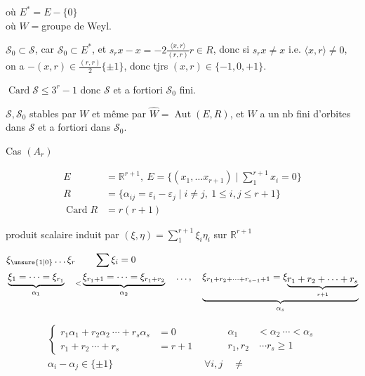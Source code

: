 où $E^*=E-\{0\}$\\ où $W={}$groupe de Weyl.

$\mathscr S_0\subset\mathscr S$, car $\mathscr S_0\subset E^*$, et  $s_rx-x=-2\frac{\langle x,r\rangle}{(r,r)}r\in R$, donc si $s_rx\ne x$ i.e. $\langle x,r\rangle\ne0$, on a $-(x,r)\in\frac{(r,r)}2\{\pm1\}$, donc  tjrs  $(x,r)\in\{-1,0,+1\}$.


$\operatorname{Card}\mathscr S\leq3^r-1$ donc $\mathscr S$ et a fortiori $\mathscr S_0$ fini.

$\mathscr S,\mathscr S_0$ stables par $W$ et même par $\widehat W=\operatorname{Aut}(E,R)$, et $W$ a un nb fini d’orbites dans $\mathscr S$ et a fortiori dans $\mathscr S_0$.

Cas $(A_r)$

\[
\begin{aligned}
E&=\mathbb R^{r+1},\ E=\{(x_1,\ldots x_{r+1})\mid\sum_1^{r+1}x_i=0\}\\
R&=\{\alpha_{ij}=\varepsilon_i-\varepsilon_j\mid i\ne j,\ 1\leq i,j\leq r+1\}\\
\operatorname{Card} R&=r(r+1)
\end{aligned}
\]

produit scalaire induit par $(\xi,\eta)=\sum_1^{r+1}\xi_i\eta_i$ sur $\mathbb R^{r+1}$ 

\[
\begin{aligned}
&\xi_{\unsure{1|0}}\ldots\xi_r\qquad\sum\xi_i=0\\
&\underbrace{\xi_{1}=\cdots=\xi_{r_1}}_{\alpha_1}\quad
\underset{<}{\phantom{a}}\underbrace{\xi_{r_1+1}=\cdots=\xi_{r_1+r_2}}_{\alpha_2}
\quad\ldots,\quad
\underbrace{\xi_{r_1+r_2+\cdots+r_{s-1}+1}=\xi_{\underbrace{r_1+r_2+\cdots+r_s}_{r+1}}}_{\alpha_s}
\end{aligned}
\]

\[
\begin{aligned}
\left\{\begin{aligned}
r_1\alpha_1+r_2\alpha_2\ \cdots+r_s\alpha_s&=0\\
r_1+r_2\ \cdots+r_s&=r+1
\end{aligned}\right.&\qquad
\begin{aligned}\alpha_1&<\alpha_2\ \cdots<\alpha_s\\r_1,r_2&\ \cdots r_s\geq1\end{aligned}\\
\alpha_i-\alpha_j\in\{\pm1\}\quad&\forall i,j\quad\ne
\end{aligned}
\]

